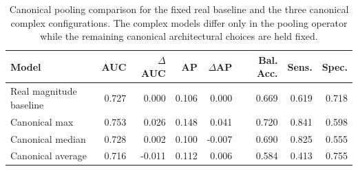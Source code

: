 \begin{table}[t]
\centering
\small
\setlength{\tabcolsep}{4pt}
\caption{Canonical pooling comparison for the fixed real baseline and the three canonical complex configurations. The complex models differ only in the pooling operator while the remaining canonical architectural choices are held fixed.}
\label{tab:canonical-comparison}
\begin{tabular}{@{}lrrrrrrr@{}}
\toprule
Model & AUC & $\Delta$AUC & AP & $\Delta$AP & Bal. Acc. & Sens. & Spec. \\
\midrule
Real magnitude baseline & 0.727 & 0.000 & 0.106 & 0.000 & 0.669 & 0.619 & 0.718 \\
Canonical max           & 0.753 & 0.026 & 0.148 & 0.041 & 0.720 & 0.841 & 0.598 \\
Canonical median        & 0.728 & 0.002 & 0.100 & -0.007 & 0.690 & 0.825 & 0.555 \\
Canonical average       & 0.716 & -0.011 & 0.112 & 0.006 & 0.584 & 0.413 & 0.755 \\
\bottomrule
\end{tabular}
\end{table}
